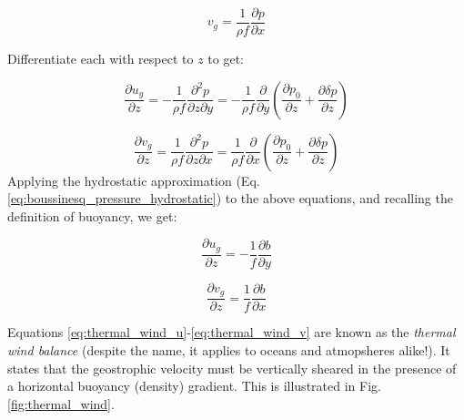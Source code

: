 \documentclass[12pt]{article}
\numberwithin{equation}{section}
\numberwithin{figure}{section}
\numberwithin{table}{section}
\begin{document}
\begin{equation}
  v_g = \frac{1}{\rho f} \frac{\partial p}{\partial x}
  \label{eq:geostrophic_v}
\end{equation}

Differentiate each with respect to $z$ to get:

\begin{equation}
  \frac{\partial u_g}{\partial z} =
  - \frac{1}{\rho f} \frac{\partial^2 p}{\partial z \partial y} =
  - \frac{1}{\rho f} \frac{\partial}{\partial y} \left( \frac{\partial p_0}{\partial z} + \frac{\partial \delta p}{\partial z} \right)
\end{equation}

\begin{equation}
  \frac{\partial v_g}{\partial z} =
  \frac{1}{\rho f} \frac{\partial^2 p}{\partial z \partial x} =
  \frac{1}{\rho f} \frac{\partial}{\partial x} \left( \frac{\partial p_0}{\partial z} + \frac{\partial \delta p}{\partial z} \right)
\end{equation}
Applying the hydrostatic approximation (Eq. \ref{eq:boussinesq_pressure_hydrostatic})
to the above equations, and recalling the definition of buoyancy, we get:

\begin{equation}
  \frac{\partial u_g}{\partial z} =
  - \frac{1}{f} \frac{\partial b}{\partial y}
  \label{eq:thermal_wind_u}
\end{equation}

\begin{equation}
  \frac{\partial v_g}{\partial z} =
  \frac{1}{f} \frac{\partial b}{\partial x}
  \label{eq:thermal_wind_v}
\end{equation}

Equations \ref{eq:thermal_wind_u}-\ref{eq:thermal_wind_v} are known as the
\textit{thermal wind balance}
(despite the name, it applies to oceans and atmopsheres alike!).
It states that the geostrophic velocity must be vertically sheared in the
presence of a horizontal buoyancy (density) gradient. 
This is illustrated in Fig. \ref{fig:thermal_wind}.
\end{document}
